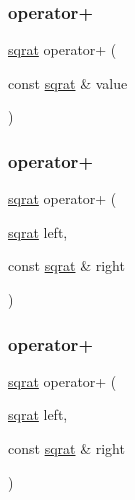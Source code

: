 \mbox{\label{classsqrat_a5a4ae2683cd1f23c81c09229d1dcc34a}} 
\subsubsection{\texorpdfstring{operator+}{operator+}\hspace{0.1cm}{\footnotesize\ttfamily [3/6]}}
{\footnotesize\ttfamily \mbox{\hyperlink{classsqrat}{sqrat}} operator+ (\begin{DoxyParamCaption}\item[{const \mbox{\hyperlink{classsqrat}{sqrat}} \&}]{value }\end{DoxyParamCaption})\hspace{0.3cm}{\ttfamily [friend]}}

\mbox{\label{classsqrat_a714592d215fdb454264df3d7bfbe0b5e}} 
\subsubsection{\texorpdfstring{operator+}{operator+}\hspace{0.1cm}{\footnotesize\ttfamily [4/6]}}
{\footnotesize\ttfamily \mbox{\hyperlink{classsqrat}{sqrat}} operator+ (\begin{DoxyParamCaption}\item[{\mbox{\hyperlink{classsqrat}{sqrat}}}]{left,  }\item[{const \mbox{\hyperlink{classsqrat}{sqrat}} \&}]{right }\end{DoxyParamCaption})\hspace{0.3cm}{\ttfamily [friend]}}

\mbox{\label{classsqrat_a714592d215fdb454264df3d7bfbe0b5e}} 
\subsubsection{\texorpdfstring{operator+}{operator+}\hspace{0.1cm}{\footnotesize\ttfamily [5/6]}}
{\footnotesize\ttfamily \mbox{\hyperlink{classsqrat}{sqrat}} operator+ (\begin{DoxyParamCaption}\item[{\mbox{\hyperlink{classsqrat}{sqrat}}}]{left,  }\item[{const \mbox{\hyperlink{classsqrat}{sqrat}} \&}]{right }\end{DoxyParamCaption})\hspace{0.3cm}{\ttfamily [friend]}}

